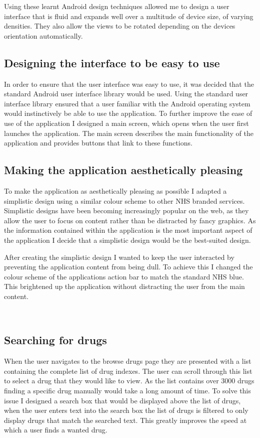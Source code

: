 Using these learnt Android design techniques allowed me to design a user interface that is fluid and expands well over a multitude of device size, of varying densities. They also allow the views to be rotated depending on the devices orientation automatically.

\subsection{Designing the interface to be easy to use}

In order to ensure that the user interface was easy to use, it was decided that the standard Android user interface library would be used. Using the standard user interface library \cite{android_design} ensured that a user familiar with the Android operating system would instinctively be able to use the application. To further improve the ease of use of the application I designed a main screen, which opens when the user first launches the application. The main screen describes the main functionality of the application and provides buttons that link to these functions.

\subsection{Making the application aesthetically pleasing}

To make the application as aesthetically pleasing as possible I adapted a simplistic design using a similar colour scheme to other NHS branded services. Simplistic designs have been becoming increasingly popular on the web, as they allow the user to focus on content rather than be distracted by fancy graphics. As the information contained within the application is the most important aspect of the application I decide that a simplistic design would be the best-suited design.

After creating the simplistic design I wanted to keep the user interacted by preventing the application content from being dull. To achieve this I changed the colour scheme of the applications action bar to match the standard NHS \cite{nhs_website} blue. This brightened up the application without distracting the user from the main content.

 
\subsection{Searching for drugs}
When the user navigates to the browse drugs page they are presented with a list containing the complete list of drug indexes. The user can scroll through this list to select a drug that they would like to view. As the list contains over 3000 drugs finding a specific drug manually would take a long amount of time. To solve this issue I designed a search box that would be displayed above the list of drugs, when the user enters text into the search box the list of drugs is filtered to only display drugs that match the searched text. This greatly improves the speed at which a user finds a wanted drug.

